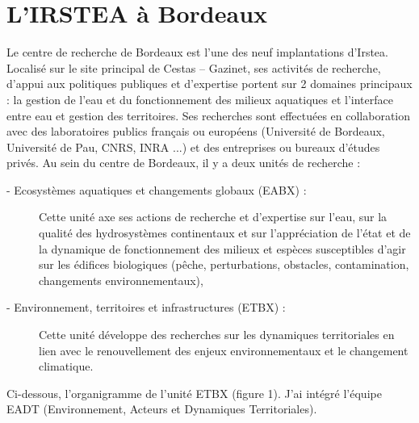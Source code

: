 \documentclass[12pt,a4paper,titlepage,twoside]{report}
\begin{document}
\section{L'IRSTEA à Bordeaux}
Le centre de recherche de Bordeaux est l’une des neuf implantations d'Irstea. Localisé sur le site principal de Cestas – Gazinet, ses activités de recherche, d’appui aux politiques publiques et d’expertise portent sur 2 domaines principaux : la gestion de l’eau et du fonctionnement des milieux aquatiques et l’interface entre eau et gestion des territoires. \newline\newline
Ses recherches sont effectuées en collaboration avec des laboratoires publics français ou européens (Université de Bordeaux, Université de Pau, CNRS, INRA ...) et des entreprises ou bureaux d’études privés. \newline\newline
Au sein du centre de Bordeaux, il y a deux unités de recherche :
\begin{description}
\item[- Ecosystèmes aquatiques et changements globaux (EABX) : ]Cette unité axe ses actions de recherche et d’expertise sur l’eau, sur la qualité des hydrosystèmes continentaux et sur l’appréciation de l’état et de la dynamique de fonctionnement des milieux et espèces susceptibles d’agir sur les édifices biologiques (pêche, perturbations, obstacles, contamination, changements environnementaux),
\item[- Environnement, territoires et infrastructures (ETBX) : ] Cette unité développe des recherches sur les dynamiques territoriales en lien avec le renouvellement des enjeux environnementaux et le changement climatique.
\end{description}
Ci-dessous, l'organigramme de l'unité ETBX (figure 1). J'ai intégré l'équipe EADT (Environnement, Acteurs et Dynamiques Territoriales). \newline
\clearpage
\end{document}
